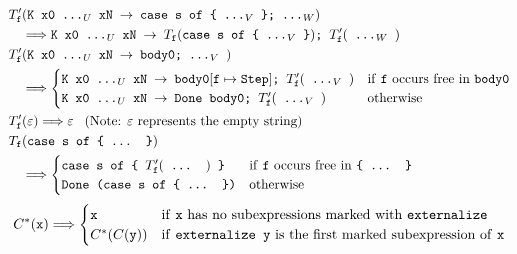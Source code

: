 \documentclass[sigplan,anonymous,review]{acmart}
\newcommand{\expr}[1]{(#1)} %
\newcommand{\rarr}{\rightarrow}
\newcommand{\rewrites}{\Longrightarrow}
\newcommand{\ttt}{\texttt}
\begin{document}
\begin{align*}
  T'_{\ttt{f}}&\expr{\ttt{K x0 ...$_U$ xN $\rarr$ case s of \{ ...$_V$ \}; ...$_W$}}\\
    &\rewrites
        \ttt{K x0 ...$_U$ xN $\rarr$ $T_{\ttt{f}}\expr{\ttt{case s of \{ ...$_V$ \}}}$; $T'_{\ttt{f}}\expr{\ttt{ ...$_W$ }}$}\\
  T'_{\ttt{f}}&\expr{\ttt{K x0 ...$_U$ xN $\rarr$ body0; ...$_V$ }}\\
    &\rewrites
      \begin{cases}
        \ttt{K x0 ...$_U$ xN $\rarr$ body0}[\ttt{f} \mapsto \ttt{Step}]\ttt{; }T'_{\ttt{f}}\expr{\ttt{ ...$_V$ }} & \text{if \ttt{f} occurs free in \ttt{body0}}\\
        \ttt{K x0 ...$_U$ xN $\rarr$ Done body0; $T'_{\ttt{f}}\expr{\ttt{ ...$_V$ }}$} & \text{otherwise}
      \end{cases}\\
  T'_{\ttt{f}}&\expr{\varepsilon} \rewrites \varepsilon\;\;\; \text{(Note: $\varepsilon$ represents the empty string)}\\
  T_{\ttt{f}}&\expr{\ttt{case s of \{ ... \}}}\\
    &\rewrites
      \begin{cases}
        \ttt{case s of \{ $T'_{\ttt{f}}\expr{\ttt{ ... }}$ \}} & \text{if \ttt{f} occurs free in \ttt{\{ ... \}}}\\
        \ttt{Done (case s of \{ ... \})} & \text{otherwise}
      \end{cases}
\end{align*}
\begin{align*}
  &C^{*}\expr{\ttt{x}} \rewrites
    \begin{cases}
      \ttt{x} & \text{if \ttt{x} has no subexpressions marked with \ttt{externalize}}\\
      C^{*}\expr{C\expr{\ttt{y}}} & \text{if \ttt{externalize y} is the first marked subexpression of \ttt{x}}\\
    \end{cases}\\
\end{align*}
\end{document}
